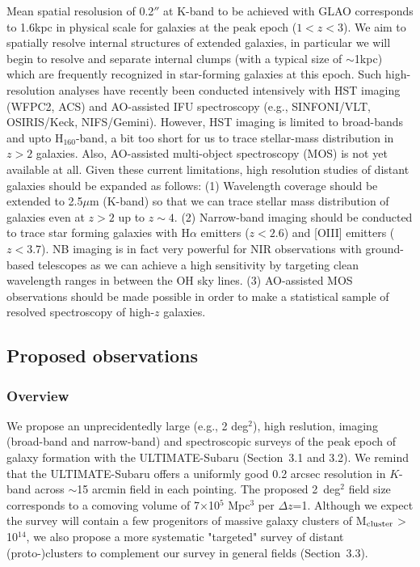 Mean spatial resolusion of 0.2$''$ at K-band to be achieved with GLAO
corresponds to 1.6kpc in physical scale for galaxies at the peak epoch ($1<z<3$).
We aim to spatially resolve internal structures of extended galaxies, in particular
we will begin to resolve and separate internal clumps (with a typical size of $\sim$1kpc)
which are frequently recognized in star-forming galaxies at this epoch.
Such high-resolution analyses have recently been conducted intensively with
HST imaging (WFPC2, ACS) and AO-assisted IFU spectroscopy
(e.g., SINFONI/VLT, OSIRIS/Keck, NIFS/Gemini).
However, HST imaging is limited to broad-bands and upto H$_{160}$-band, a bit
too short for us to trace stellar-mass distribution in $z>2$ galaxies.
Also, AO-assisted multi-object spectroscopy (MOS) is not yet available at all.
Given these current limitations, high resolution studies of distant galaxies
should be expanded as follows:
(1) Wavelength coverage should be extended to 2.5$\mu$m (K-band) so that
we can trace stellar mass distribution of galaxies even at $z>2$ up to $z\sim4$.
(2) Narrow-band imaging should be conducted to trace star forming galaxies
with H$\alpha$ emitters ($z<2.6$) and [OIII] emitters ($z<3.7$).
NB imaging is in fact very powerful for NIR observations with ground-based
telescopes as we can achieve a high sensitivity by targeting clean wavelength ranges
in between the OH sky lines.
(3) AO-assisted MOS observations should be made possible in order to make
a statistical sample of resolved spectroscopy of high-$z$ galaxies.

\subsection{Proposed observations}

\subsubsection{Overview}

We propose an unprecidentedly large (e.g., 2 deg$^2$), high reslution, imaging 
(broad-band and narrow-band) and spectroscopic surveys of the peak epoch of galaxy 
formation with the ULTIMATE-Subaru (Section~3.1 and 3.2). We remind that the 
ULTIMATE-Subaru offers a uniformly good 0.2 arcsec resolution in $K$-band across 
$\sim$15 arcmin field in each pointing. The proposed 2~deg$^2$ field size corresponds
to a comoving volume of 7$\times$10$^5$ Mpc$^3$ per $\Delta$$z$=1. 
Although we expect the survey will contain a few progenitors of massive galaxy 
clusters of M$_{\rm cluster}$$>$10$^{14}$\msun, 
we also propose a more systematic "targeted" survey of distant (proto-)clusters 
to complement our survey in general fields (Section~3.3). 

